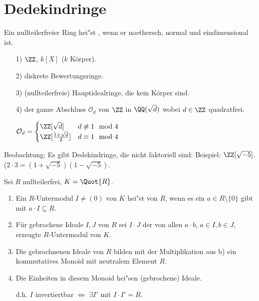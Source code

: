 \section{Dedekindringe}

\begin{Def}

Ein nullteilerfreier Ring hei"st , wenn er noethersch, normal und eindimensional ist.

\begin{nnBsp}
\begin{enumerate}
\item[1)] $\ZZ$, $k[X]$ ($k$ K\"orper).

\item[2)] diskrete Bewertungsringe.

\item[3)] (nullteilerfreie) Hauptidealringe, die kein Körper sind.

\item[4)] der ganze Abschluss $\mathcal{O}_d$ von $\ZZ$ in $\QQ(\sqrt{d})$ wobei $d \in \ZZ$ quadratfrei.

$\mathcal{O}_d = \begin{cases}
\ZZ[\sqrt{d}] & d \not\equiv 1 \mod 4\\
\ZZ[\frac{1+\sqrt{d}}{2}] & d \equiv 1 \mod 4
\end{cases}$

\end{enumerate}
\end{nnBsp}

\end{Def}

Beobachtung: Es gibt Dedekindringe, die nicht faktoriell sind: Beispiel:
$\ZZ[\sqrt{-5}]$. ($2 \cdot 3 = (1 + \sqrt{-5}) (1 - \sqrt{-5})$.

\begin{DefBem}
Sei $R$ nullteilerfrei, $K = \Quot{R}$.
\begin{enumerate}
\item Ein $R$-Untermodul $I \neq (0)$ von $K$ hei"st  von $R$, wenn es ein $a \in R \setminus \{0\}$ gibt mit $a \cdot I \subseteq R$.

\item F\"ur gebrochene Ideale $I,J$ von $R$ sei $I \cdot J$ der von allen $a \cdot b$, $a \in I, b \in J$, erzeugte $R$-Untermodul von $K$.

\item Die gebrochnenen Ideale von $R$ bilden mit der Multiplikation aus b) ein kommutatives Monoid mit neutralem Element $R$.

\item Die Einheiten in diesem Monoid hei"sen  (gebrochene) Ideale.

d.h. $I$ invertiertbar $\Leftrightarrow$ $\exists I'$ mit $I \cdot I' = R$.

\end{enumerate}
\end{DefBem}

